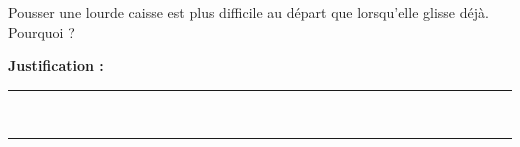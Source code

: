 Pousser une lourde caisse est plus difficile au départ que lorsqu'elle glisse déjà. Pourquoi ?

\choices

\noindent\textbf{Justification :} \hrulefill \\[2.5ex]
\rule{\linewidth}{0.4pt} \\[2.5ex]
\rule{\linewidth}{0.4pt}
\vfill
